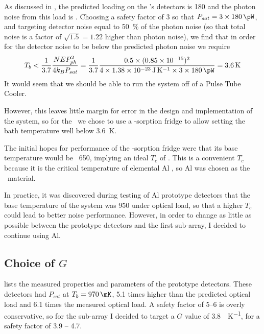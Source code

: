 As discussed in , the predicted loading on the \Imager's detectors is \SI{180}{\pW} and the photon noise from this load is .
Choosing a safety factor of 3 so that $P_{sat} = 3 \times \SI{180}{\pW}$, and targeting detector noise equal to \SI{50}{\percent} of the photon noise (so that total noise is a factor of $\sqrt{1.5} = 1.22$ higher than photon noise), we find that in order for the detector noise to be below the predicted photon noise we require
\begin{equation}
  T_b < \frac{1}{3.7} \frac{\NEPph^2}{4 k_B P_{sat}} =
        \frac{1}{3.7} \frac{0.5 \times (\num{0.85e-15})^2}{4 \times \SI{1.38e-23}{\J\per\K} \times 3 \times \SI{180}{\pW}} = 
        \SI{3.6}{\K}
\end{equation}
It would seem that we should be able to run the system off of a Pulse Tube Cooler.

However, this leaves little margin for error in the design and implementation of the system, so for the \Imager\ we chose to use a -sorption fridge to allow setting the bath temperature well below \SI{3.6}{\K}.

The initial hopes for performance of the -sorption fridge were that its base temperature would be ~\SI{650}{\mK}, implying an ideal $T_c$ of .
This is a convenient $T_c$ because it is the critical temperature of elemental Al \cite{matthias_superconductivity_1963}, so Al was chosen as the \TES\ material.

In practice, it was discovered during testing of Al prototype detectors that the base temperature of the system was \SI{950}{\mK} under optical load, so that a higher $T_c$ could lead to better noise performance.
However, in order to change as little as possible between the prototype detectors and the first sub-array, I decided to continue using Al.

\subsection{Choice of $G$}

 lists the measured properties and parameters of the prototype detectors.
These detectors had $P_{sat}$ at $T_b = \SI{970}{\mK}$, 5.1 times higher than the predicted optical load and 6.1 times the measured optical load.
A safety factor of 5--6 is overly conservative, so for the sub-array I decided to target a $G$ value of \SI{3.8}{\nW\per\K}, for a safety factor of 3.9 -- 4.7.


